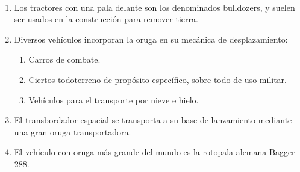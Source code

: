\begin{example}
  ~
  \begin{enumerate}
  \item Los tractores con una pala delante son los denominados
    bulldozers, y suelen ser usados en la construcción para remover
    tierra.
  \item Diversos vehículos incorporan la oruga en su mecánica de desplazamiento:
    \begin{enumerate}
    \item Carros de combate.
    \item Ciertos todoterreno de propósito específico, sobre todo de
      uso militar.
    \item Vehículos para el transporte por nieve e hielo.
    \end{enumerate}
  \item El transbordador espacial se transporta a su base de
    lanzamiento mediante una gran oruga transportadora.
  \item El vehículo con oruga más grande del mundo es la rotopala alemana Bagger 288.
  \end{enumerate}
\end{example}